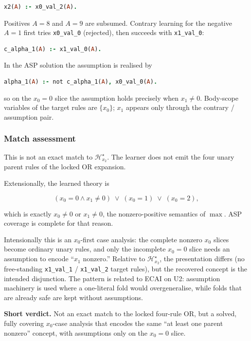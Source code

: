\documentclass[11pt]{article}
\begin{document}
\begin{lstlisting}[style=logic,language=Prolog]
x2(A) :- x0_val_2(A).
\end{lstlisting}

Positives \(A=8\) and \(A=9\) are subsumed. Contrary learning for the negative \(A=1\) first tries \texttt{x0\_val\_0} (rejected), then succeeds with \texttt{x1\_val\_0}:

\begin{lstlisting}[style=logic,language=Prolog]
c_alpha_1(A) :- x1_val_0(A).
\end{lstlisting}

In the ASP solution the assumption is realised by

\begin{lstlisting}[style=logic,language=Prolog]
alpha_1(A) :- not c_alpha_1(A), x0_val_0(A).
\end{lstlisting}

so on the \(x_0=0\) slice the assumption holds precisely when \(x_1\neq 0\). Body-scope variables of the target rules are \(\{x_0\}\); \(x_1\) appears only through the contrary / assumption pair.

\subsubsection{Match assessment}

This is not an exact match to \(\mathcal{H}_{x_2}^\star\). The learner does not emit the four unary parent rules of the locked OR expansion.

Extensionally, the learned theory is

\[ (x_0=0 \land x_1\neq 0)\;\lor\;(x_0=1)\;\lor\;(x_0=2), \]

which is exactly \(x_0\neq 0\) or \(x_1\neq 0\), the nonzero-positive semantics of \(\max\). ASP coverage is complete for that reason.

Intensionally this is an \(x_0\)-first case analysis: the complete nonzero \(x_0\) slices become ordinary unary rules, and only the incomplete \(x_0=0\) slice needs an assumption to encode ``\(x_1\) nonzero.'' Relative to \(\mathcal{H}_{x_2}^\star\), the presentation differs (no free-standing \texttt{x1\_val\_1} / \texttt{x1\_val\_2} target rules), but the recovered concept is the intended disjunction. The pattern is related to ECAI on U2: assumption machinery is used where a one-literal fold would overgeneralise, while folds that are already safe are kept without assumptions.

\textbf{Short verdict.} Not an exact match to the locked four-rule OR, but a solved, fully covering \(x_0\)-case analysis that encodes the same ``at least one parent nonzero'' concept, with assumptions only on the \(x_0=0\) slice.
\end{document}

